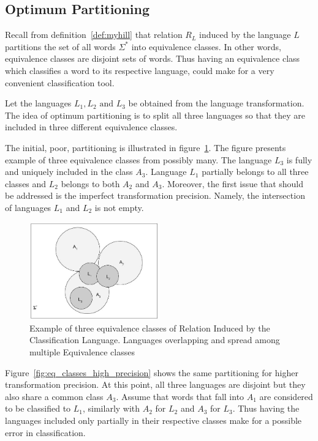\documentclass{mini}
\begin{document}
\subsection{Optimum Partitioning}\label{sec:lan_theory_class_lan_opt_part}

Recall from definition~\ref{def:myhill} that relation $R_L$ induced by the language $L$ partitions the set of all words $\Sigma^{*}$ into equivalence classes. In other words, equivalence classes are disjoint sets of words. Thus having an equivalence class which classifies a word to its respective language, could make for a very convenient classification tool.

Let the languages $L_{1}, L_{2} \text{ and } L_{3}$ be obtained from the language transformation. The idea of optimum partitioning is to split all three languages so that they are included in three different equivalence classes. 

The initial, poor, partitioning is illustrated in figure~\ref{fig:eq_classes_small_precision}. The figure presents example of three equivalence classes from possibly many. The language $L_{3}$ is fully and uniquely included in the class $A_{3}$. Language $L_{1}$ partially belongs to all three classes and $L_{2}$ belongs to both $A_{2}$ and $A_{3}$. Moreover, the first issue that should be addressed is the imperfect transformation precision. Namely, the intersection of languages $L_{1}$ and $L_{2}$ is not empty.

\begin{figure}[H]
    \centering
    \includegraphics[width=0.5\textwidth]{./images/equivalence_classes_small_pt.jpg}
    \caption{Example of three equivalence classes of Relation Induced by the Classification Language. Languages overlapping and spread among multiple Equivalence classes}
    \label{fig:eq_classes_small_precision}
\end{figure}

Figure~\ref{fig:eq_classes_high_precision} shows the same partitioning for higher transformation precision. At this point, all three languages are disjoint but they also share a common class $A_{3}$. Assume that words that fall into $A_{1}$ are considered to be classified to $L_{1}$, similarly with $A_{2}$ for $L_{2}$ and $A_{3}$ for $L_{3}$. Thus having the languages included only partially in their respective classes make for a possible error in classification.
\end{document}
